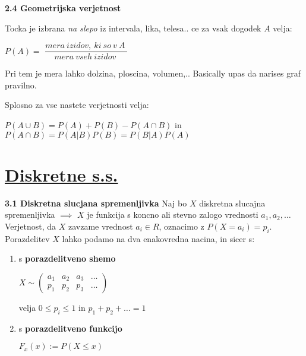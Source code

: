 \documentclass{article}
\begin{document}
\begin{multicols}{3}
\textbf{2.4 Geometrijska verjetnost}


Tocka je izbrana \textit{na slepo} iz intervala, lika, telesa.. ce za
vsak dogodek $A$ velja:
\begin{center}
    \begin{math}
        P(A) =
    \end{math}
    \smallskip
    \begin{math}
       \dfrac{
        mera\: izidov,\: ki\: so\: v\: A\:
        }
       {mera\: vseh\: izidov\:}
    \end{math}
\end{center}
Pri tem je mera lahko dolzina, ploscina, volumen,..
Basically upas da narises graf pravilno.

Splosno za vse nastete verjetnosti velja:
\begin{center}
    \begin{math}
    P(A \cup B) = P(A) + P(B) - P(A \cap B)
    \end{math} in 
    \begin{math}
        P(A \cap B) = P(A | B) P(B) = P(B | A) P(A)
    \end{math}
\end{center}

\section{\underline{Diskretne s.s.}}

\textbf{3.1 Diskretna slucjana spremenljivka}
Naj bo $X$ diskretna slucajna spremenljivka $\implies$ $X$ je funkcija
s koncno ali stevno zalogo  vrednosti ${ a_{1}, a_{2}, \dots}$ Verjetnost, 
da $X$ zavzame vrednost $a_{i} \in R$, oznacimo z $P(X = a_{i}) = p_{i}$. Porazdelitev
$X$ lahko podamo na dva enakovredna nacina, in sicer s:
\begin{enumerate}
    \item s \textbf{porazdelitveno shemo}
        \begin{center}
            \begin{math}
                X \sim
                \begin{pmatrix}
                    a_{1} & a_{2} & a_{3} & \dots \\
                    p_{1} & p_{2} & p_{3} & \dots
                \end{pmatrix}
            \end{math}
        \end{center}
        velja $0 \leq p_{i} \leq 1$ in $p_{1} + p_{2} + \dots = 1$
    \item s \textbf{porazdelitveno funkcijo}
        \begin{center}
            \begin{math}
                F_{x}(x) := P(X \leq x)
            \end{math}
        \end{center}
\end{enumerate}


\end{multicols}
\end{document}
